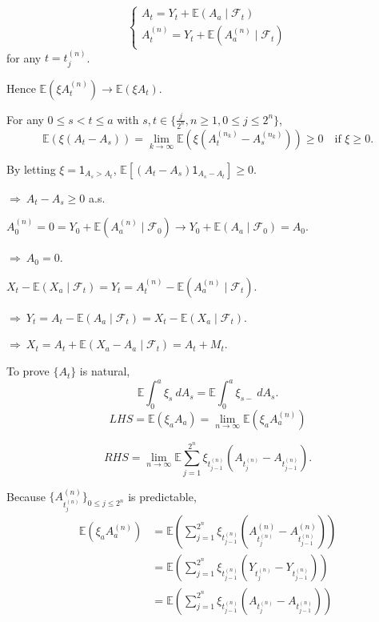 {    $$\begin{cases}
        A_t = Y_t + \mathbb{E}(A_a \mid \mathcal{F}_t) \\
        A_t^{(n)} = Y_t + \mathbb{E}(A_a^{(n)} \mid \mathcal{F}_t)
    \end{cases}$$ 
    for any $t = t_{j}^{(n)}$.

    Hence $\mathbb{E}(\xi A_t^{(n)}) \to \mathbb{E}(\xi A_t)$. 

    For any $0 \leq s < t \leq a$ with $s,t \in \{\frac{j}{2^n}, n \geq 1, 0 \leq j \leq 2^n\}$,
    $$
        \mathbb{E}(\xi (A_t - A_s)) = \lim_{k \to \infty}\mathbb{E}(\xi (A_t^{(n_k)} - A_s^{(n_k)}) ) \geq 0 \quad \text{if } \xi \geq 0.
    $$

    By letting $\xi = \mathsf{1}_{A_s > A_t}$, $\mathbb{E}\left[ (A_t - A_s) \mathsf{1}_{A_s - A_t} \right] \geq 0.$

    $\Rightarrow~ A_t - A_s \geq 0$ a.s.

    $A_0^{(n)} = 0 = Y_0 + \mathbb{E}(A_a^{(n)} \mid \mathcal{F}_0) \to Y_0 + \mathbb{E}(A_a \mid \mathcal{F}_0) = A_0$.

    $\Rightarrow~ A_0 = 0$.

    $X_t - \mathbb{E}(X_a \mid \mathcal{F}_t) =Y_t = A_t^{(n)}- \mathbb{E}(A_a^{(n)} \mid \mathcal{F}_t).$

    $\Rightarrow~ Y_t = A_t - \mathbb{E}(A_a \mid \mathcal{F}_t) = X_t-\mathbb{E}(X_a \mid \mathcal{F}_t).$

    $\Rightarrow~ X_t = A_t + \mathbb{E}(X_a - A_a \mid \mathcal{F}_t) = A_t + M_t$.

    To prove $\{A_t\}$ is natural,
    $$\mathbb{E}\int_{0}^{a} \xi_s ~dA_s = \mathbb{E}\int_{0}^{a}\xi_{s-}~dA_s.$$
    $$LHS = \mathbb{E}(\xi_a A_a) = \lim_{n \to \infty}\mathbb{E}(\xi_a A_a^{(n)})$$

    $$
    RHS = \lim_{n \to \infty} \mathbb{E} \sum_{j=1}^{2^n}\xi_{t_{j-1}^{(n)}}(A_{t_{j}^{(n)}} - A_{t_{j-1}^{(n)}}).
    $$

    Because $\{A_{t_{j}^{(n)}}^{(n)}\}_{0 \leq j \leq 2^n}$ is predictable,
    $$
    \begin{aligned}
    \mathbb{E}(\xi_a A_a^{(n)}) &= \mathbb{E}\left( \sum_{j=1}^{2^n}\xi_{t_{j-1}^{(n)}} (A_{t_{j}^{(n)}}^{(n)} - A_{t_{j-1}^{(n)}}^{(n)}) \right)\\
    &=\mathbb{E}\left( \sum_{j=1}^{2^n}\xi_{t_{j-1}^{(n)}}(Y_{t_{j}^{(n)}}-Y_{t_{j-1}^{(n)}}) \right)\\
    &=\mathbb{E}\left( \sum_{j=1}^{2^n}\xi_{t_{j-1}^{(n)}}(A_{t_{j}^{(n)}}-A_{t_{j-1}^{(n)}}) \right)
    \end{aligned}
    $$
}


